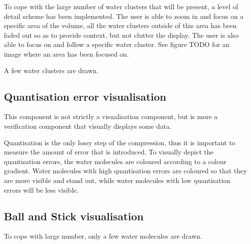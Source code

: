 To cope with the large number of water clusters that will be present, a level
of detail scheme has been implemented. The user is able to zoom in and focus on
a specific area of the volume, all the water clusters outside of this area has
been faded out so as to provide context, but not clutter the display.  The user
is also able to focus on and follow a specific water cluster. See figure TODO
for an image where an area has been focused on.

A few water clusters are drawn.


\subsection{Quantisation error visualisation}
\label{sub:design_quanterror}

This component is not strictly a visualisation component, but is more a
verification component that visually displays some data.

Quantisation is the only lossy step of the compression, thus it is important to
measure the amount of error that is introduced. To visually depict the
quantisation errors, the water molecules are coloured according to a colour
gradient. Water molecules with high quantisation errors are coloured so that
they are more visible and stand out, while water molecules with low
quantisation errors will be less visible.


\subsection{Ball and Stick visualisation}
\label{sub:design_ballstick}

To cope with large number, only a few water molecules are drawn.




